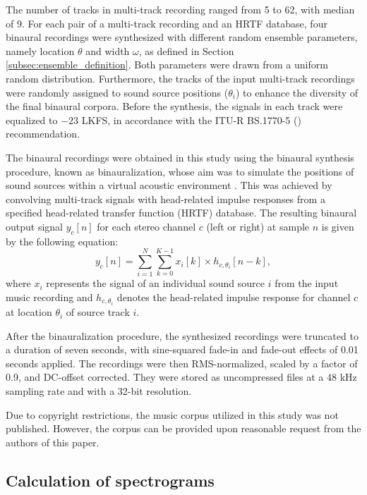 \documentclass[11pt]{article}
\begin{document}
The number of tracks in multi-track recording ranged from 5 to 62, with median of 9. For each pair of a multi-track recording and an HRTF database, four binaural recordings were synthesized with different random ensemble parameters, namely location $\theta$ and width $\omega$, as defined in Section \ref{subsec:ensemble_definition}. Both parameters were drawn from a uniform random distribution. Furthermore, the tracks of the input multi-track recordings were randomly assigned to sound source positions ($\theta_i$) to enhance the diversity of the final binaural corpora. Before the synthesis, the signals in each track were equalized to $-23$ LKFS, in accordance with the ITU-R BS.1770-5 (\citeyear{noauthor_itu-r_2023}) recommendation. 

The binaural recordings were obtained in this study using the binaural synthesis procedure, known as binauralization, whose aim was to simulate the positions of sound sources within a virtual acoustic environment \parencite{blauert_spatial_1996}. This was achieved by convolving multi-track signals with head-related impulse responses from a specified head-related transfer function (HRTF) database. The resulting binaural output signal $y_c[n]$ for each stereo channel $c$ (left or right) at sample $n$ is given by the following equation:
\begin{equation}
  y_c[n] = \sum_{i=1}^{N} \sum_{k=0}^{K-1} x_i[k] \times h_{c,\theta_i}[n-k] ,
\end{equation}
where $x_i$ represents the signal of an individual sound source $i$ from the input music recording and $h_{c,\theta_i}$ denotes the head-related impulse response for channel $c$ at location $\theta_i$ of source track $i$.

After the binauralization procedure, the synthesized recordings were truncated to a duration of seven seconds, with sine-squared fade-in and fade-out effects of 0.01 seconds applied. The recordings were then RMS-normalized, scaled by a factor of 0.9, and DC-offset corrected. They were stored as uncompressed files at a 48 kHz sampling rate and with a 32-bit resolution.

Due to copyright restrictions, the music corpus utilized in this study was not published. However, the corpus can be provided upon reasonable request from the authors of this paper.

\subsection{Calculation of spectrograms}
\label{subsec:feature_extraction}
\end{document}
